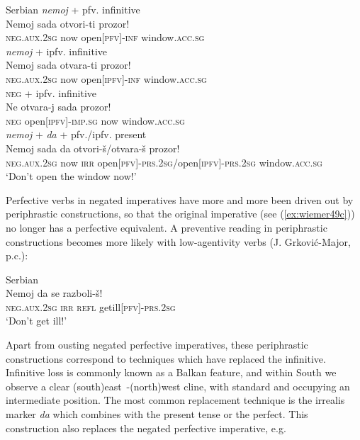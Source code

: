 \documentclass[output=paper,colorlinks,citecolor=brown]{langscibook}
\begin{document}
\ea \textnormal{Serbian}
\label{ex:wiemer49} 
\ea \label{ex:wiemer49a} \textnormal{\textit{nemoj} + pfv. infinitive} \\
\gll Nemoj sada otvori-ti prozor! \\
\textsc{neg.aux.2sg} now open\textsc{[pfv]-inf} window\textsc{.acc.sg} \\
\ex \label{ex:wiemer49b} \textnormal{\textit{nemoj} + ipfv. infinitive} \\
\gll Nemoj sada otvara-ti prozor! \\
\textsc{neg.aux.2sg} now open\textsc{[ipfv]-inf} window\textsc{.acc.sg} \\
\ex \label{ex:wiemer49c} \textnormal{\textsc{neg} + ipfv. infinitive} \\
\gll Ne otvara-j sada prozor! \\
\textsc{neg} open\textsc{[ipfv]-imp.sg} now window\textsc{.acc.sg} \\
\ex \label{ex:wiemer49d} \textnormal{\textit{nemoj} + \textit{da} + pfv./ipfv. present} \\
\gll Nemoj sada da otvori-š\textnormal{/}otvara-š prozor! \\
\textsc{neg.aux.2sg} now \textsc{irr} open\textsc{[pfv]-prs.2sg}/open\textsc{[ipfv]-prs.2sg} window\textsc{.acc.sg} \\
\glt `Don't open the window now!'
\z
\z


 Perfective verbs in negated imperatives have more and more been driven out by periphrastic constructions, so that the original imperative (see (\ref{ex:wiemer49c})) no longer has a perfective equivalent. A preventive reading in periphrastic constructions becomes more likely with low-agentivity verbs (J. Grković-Major, p.c.):


\ea \textnormal{Serbian} \\
\label{ex:wiemer50} 
\gll Nemoj da se razboli-š! \\
\textsc{neg.aux.2sg} \textsc{irr} \textsc{refl} get\textunderscore ill\textsc{[pfv]-prs.2sg} \\
\glt `Don't get ill!'
\z


 Apart from ousting negated perfective imperatives, these periphrastic constructions correspond to techniques which have replaced the infinitive. Infinitive loss is commonly known as a Balkan feature, and within South  we observe a clear (south)east~-(north)west cline, with standard  and  occupying an intermediate position. The most common replacement technique is the irrealis marker \textit{da} which combines with the present tense or the perfect. This construction also replaces the negated perfective imperative, e.g.
\end{document}
